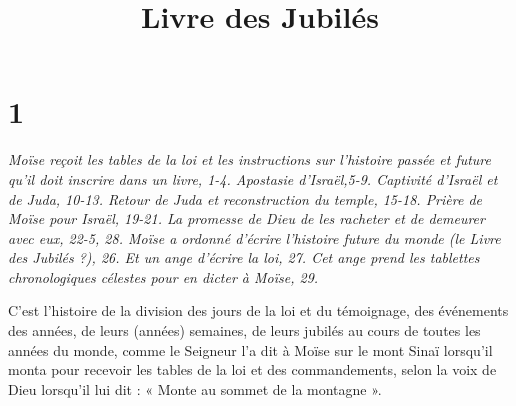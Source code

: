 

\title{Livre des Jubilés}

\chapter{1}

\par \textit{Moïse reçoit les tables de la loi et les instructions sur l'histoire passée et future qu'il doit inscrire dans un livre, 1-4. Apostasie d'Israël,5-9. Captivité d'Israël et de Juda, 10-13. Retour de Juda et reconstruction du temple, 15-18. Prière de Moïse pour Israël, 19-21. La promesse de Dieu de les racheter et de demeurer avec eux, 22-5, 28. Moïse a ordonné d'écrire l'histoire future du monde (le Livre des Jubilés ?), 26. Et un ange d'écrire la loi, 27. Cet ange prend les tablettes chronologiques célestes pour en dicter à Moïse, 29.}

\par C'est l'histoire de la division des jours de la loi et du témoignage, des événements des années, de leurs (années) semaines, de leurs jubilés au cours de toutes les années du monde, comme le Seigneur l'a dit à Moïse sur le mont Sinaï lorsqu'il monta pour recevoir les tables de la loi et des commandements, selon la voix de Dieu lorsqu'il lui dit : « Monte au sommet de la montagne ».


